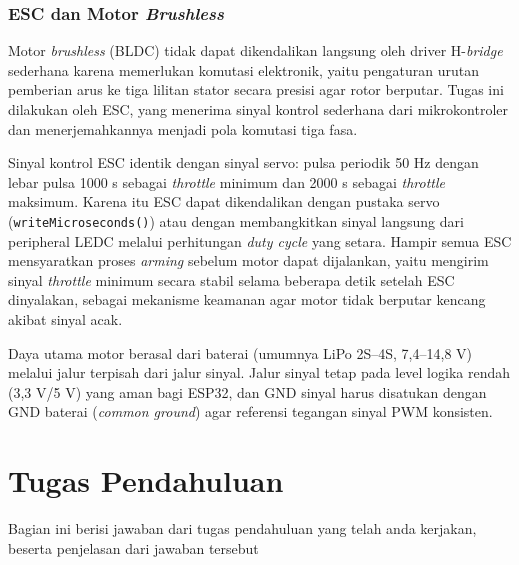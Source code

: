 \subsubsection{ESC dan Motor \textit{Brushless}}
Motor \textit{brushless} (BLDC) tidak dapat dikendalikan langsung oleh driver
H-\textit{bridge} sederhana karena memerlukan komutasi elektronik, yaitu
pengaturan urutan pemberian arus ke tiga lilitan stator secara presisi agar
rotor berputar. Tugas ini dilakukan oleh ESC, yang menerima sinyal kontrol
sederhana dari mikrokontroler dan menerjemahkannya menjadi pola komutasi
tiga fasa.

Sinyal kontrol ESC identik dengan sinyal servo: pulsa periodik 50 Hz dengan
lebar pulsa 1000 \textmu s sebagai \textit{throttle} minimum dan 2000 \textmu s
sebagai \textit{throttle} maksimum. Karena itu ESC dapat dikendalikan dengan
pustaka servo (\texttt{writeMicroseconds()}) atau dengan membangkitkan sinyal
langsung dari peripheral LEDC melalui perhitungan \textit{duty cycle} yang
setara. Hampir semua ESC mensyaratkan proses \textit{arming}
sebelum motor dapat dijalankan, yaitu mengirim sinyal \textit{throttle}
minimum secara stabil selama beberapa detik setelah ESC dinyalakan, sebagai
mekanisme keamanan agar motor tidak berputar kencang akibat sinyal acak.

Daya utama motor berasal dari baterai (umumnya LiPo 2S--4S, 7,4--14,8 V) melalui
jalur terpisah dari jalur sinyal. Jalur sinyal tetap pada level logika rendah
(3,3 V/5 V) yang aman bagi ESP32, dan GND sinyal harus disatukan dengan GND
baterai (\textit{common ground}) agar referensi tegangan sinyal PWM konsisten.
\section{Tugas Pendahuluan}
Bagian ini berisi jawaban dari tugas pendahuluan yang telah anda kerjakan, beserta penjelasan dari jawaban tersebut

